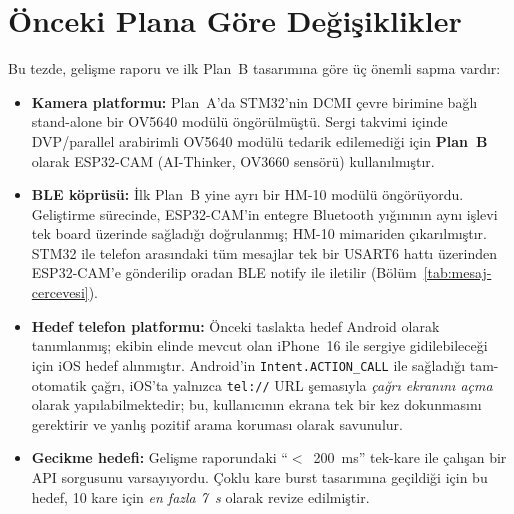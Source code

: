 \section{Önceki Plana Göre Değişiklikler}
\label{sec:degisiklikler}

Bu tezde, gelişme raporu ve ilk Plan~B tasarımına göre üç önemli sapma
vardır:

\begin{itemize}
    \item \textbf{Kamera platformu:} Plan~A'da STM32'nin DCMI çevre
          birimine bağlı stand-alone bir OV5640 modülü öngörülmüştü.
          Sergi takvimi içinde DVP/parallel arabirimli OV5640 modülü
          tedarik edilemediği için \textbf{Plan~B} olarak ESP32-CAM
          (AI-Thinker, OV3660 sensörü) kullanılmıştır.
    \item \textbf{BLE köprüsü:} İlk Plan~B yine ayrı bir HM-10 modülü
          öngörüyordu. Geliştirme sürecinde, ESP32-CAM'in entegre Bluetooth
          yığınının aynı işlevi tek board üzerinde sağladığı doğrulanmış;
          HM-10 mimariden çıkarılmıştır. STM32 ile telefon arasındaki tüm
          mesajlar tek bir USART6 hattı üzerinden ESP32-CAM'e gönderilip
          oradan BLE notify ile iletilir (Bölüm~\ref{tab:mesaj-cercevesi}).
    \item \textbf{Hedef telefon platformu:} Önceki taslakta hedef
          Android olarak tanımlanmış; ekibin elinde mevcut olan iPhone~16
          ile sergiye gidilebileceği için iOS hedef alınmıştır. Android'in
          \texttt{Intent.ACTION\_CALL} ile sağladığı tam-otomatik çağrı,
          iOS'ta yalnızca \texttt{tel://} URL şemasıyla \emph{çağrı
          ekranını açma} olarak yapılabilmektedir; bu, kullanıcının ekrana
          tek bir kez dokunmasını gerektirir ve yanlış pozitif arama
          koruması olarak savunulur.
    \item \textbf{Gecikme hedefi:} Gelişme raporundaki ``$<$~200~ms''
          tek-kare ile çalışan bir API sorgusunu varsayıyordu. Çoklu kare
          burst tasarımına geçildiği için bu hedef, 10 kare için
          \emph{en fazla 7~s} olarak revize edilmiştir.
\end{itemize}

